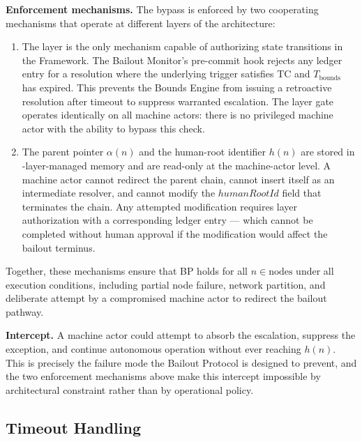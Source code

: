 \bigskip
\noindent\textbf{Enforcement mechanisms.} The bypass is enforced by two cooperating mechanisms that operate at different layers of the \bxthree{} architecture:

\begin{enumerate}
    \item[\textbf{Fact Layer gate (enforcement at the authorization layer).}] The \fact{} layer is the only mechanism capable of authorizing state transitions in the \bxthree{} Framework. The Bailout Monitor's pre-commit hook rejects any ledger entry for a resolution where the underlying trigger satisfies TC and $T_{\text{bounds}}$ has expired. This prevents the Bounds Engine from issuing a retroactive resolution after timeout to suppress warranted escalation. The \fact{} layer gate operates identically on all machine actors: there is no privileged machine actor with the ability to bypass this check.

    \item[\textbf{Immutable parent-pointer and human-root architecture (enforcement at the data model layer).}] The parent pointer $\alpha(n)$ and the human-root identifier $h(n)$ are stored in \fact-layer-managed memory and are read-only at the machine-actor level. A machine actor cannot redirect the parent chain, cannot insert itself as an intermediate resolver, and cannot modify the $humanRootId$ field that terminates the chain. Any attempted modification requires \purpose{} layer authorization with a corresponding ledger entry — which cannot be completed without human approval if the modification would affect the bailout terminus.
\end{enumerate}

Together, these mechanisms ensure that BP holds for all $n \in \text{nodes}$ under all execution conditions, including partial node failure, network partition, and deliberate attempt by a compromised machine actor to redirect the bailout pathway.

\bigskip
\noindent\textbf{Intercept.} A machine actor could attempt to absorb the escalation, suppress the exception, and continue autonomous operation without ever reaching $h(n)$. This is precisely the failure mode the Bailout Protocol is designed to prevent, and the two enforcement mechanisms above make this intercept impossible by architectural constraint rather than by operational policy.

\subsection{Timeout Handling}\label{sec:timeout-handling}

